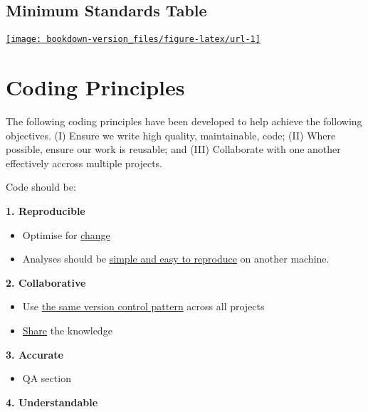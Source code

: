 \documentclass[]{book}
\providecommand{\tightlist}{%
  \setlength{\itemsep}{0pt}\setlength{\parskip}{0pt}}
\begin{document}
\hypertarget{msctable}{%
\section{Minimum Standards Table}\label{msctable}}

\href{https://moj-analytical-services.github.io/our-coding-standards/web/}{\texttt{[image: bookdown-version\_files/figure-latex/url-1]} }

\hypertarget{principles}{%
\chapter{Coding Principles}\label{principles}}

The following coding principles have been developed to help achieve the following objectives. (I) Ensure we write high quality, maintainable, code; (II) Where possible, ensure our work is reusable; and (III) Collaborate with one another effectively accross multiple projects.

Code should be:

\textbf{1. Reproducible}

\begin{itemize}
\tightlist
\item
  Optimise for \protect\hyperlink{change}{change}\\
\item
  Analyses should be \protect\hyperlink{reproduce}{simple and easy to reproduce} on another machine.
\end{itemize}

\textbf{2. Collaborative}

\begin{itemize}
\tightlist
\item
  Use \protect\hyperlink{versioncontrol}{the same version control pattern} across all projects\\
\item
  \protect\hyperlink{knowledge}{Share} the knowledge
\end{itemize}

\textbf{3. Accurate}

\begin{itemize}
\tightlist
\item
  QA section
\end{itemize}

\textbf{4. Understandable}
\end{document}
